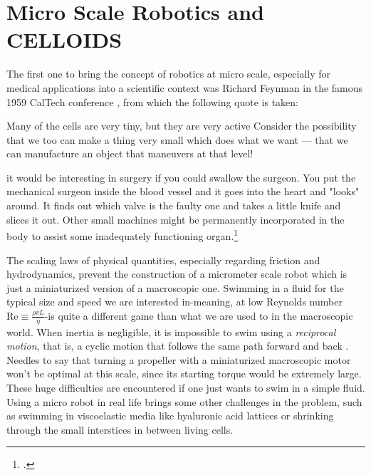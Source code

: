 \documentclass[../../master_thesis_np.tex]{subfiles}
\begin{document}
	\section{Micro Scale Robotics and CELLOIDS}
	The first one to bring the concept of robotics at micro scale, especially for medical applications into a scientific context was Richard Feynman in the famous 1959 CalTech conference , from which the following quote is taken:
	\begin{displayquote}
		Many of the cells are very tiny, but they are very active \omissis Consider the possibility that we too can make a thing very small which does what we want — that we can manufacture an object that maneuvers at that level!
		
		\omissis it would be interesting in surgery if you could swallow the surgeon. You put the mechanical surgeon inside the blood vessel and it goes into the heart and "looks" around. \omissis It finds out which valve is the faulty one and takes a little knife and slices it out. Other small machines might be permanently incorporated in the body to assist some inadequately functioning organ.\footcite{Feynman}
	\end{displayquote}
	
	The scaling laws of physical quantities, especially regarding friction and hydrodynamics, prevent the construction of a micrometer scale robot which is just a miniaturized version of a macroscopic one. Swimming in a fluid for the typical size and speed we are interested in-meaning, at low Reynolds number $\mathrm{Re} \equiv \frac{\rho v L}{\eta}$-is quite a different game than what we are used to in the macroscopic world. When inertia is negligible, it is impossible to swim using a \emph{reciprocal motion}, that is, a cyclic motion that follows the same path forward and back \cite{purcell_life_1977}. Needles to say that turning a propeller with a miniaturized macroscopic motor won't be optimal at this scale, since its starting torque would be extremely large. These huge difficulties are encountered if one just wants to swim in a simple fluid. Using a micro robot in real life brings some other challenges in the problem, such as swimming in viscoelastic media like hyaluronic acid lattices or shrinking through the small interstices in between living cells.
	
\end{document}
